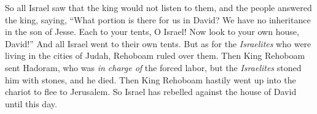 \begin{biblechapter}
\verse So all Israel saw that the king would not listen to them, and the people answered the king, saying, “What portion is there for us in David? We have no inheritance in the son of Jesse. Each to your tents, O Israel! Now look to your own house, David!” And all Israel went to their own tents.
\verse But as for the \textit{Israelites} who were living in the cities of Judah, Rehoboam ruled over them.
\verse Then King Rehoboam sent Hadoram, who was \textit{in charge of} the forced labor, but the \textit{Israelites} stoned him with stones, and he died. Then King Rehoboam hastily went up into the chariot to flee to Jerusalem.
\verse So Israel has rebelled against the house of David until this day.
\end{biblechapter}

